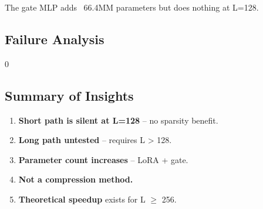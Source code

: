 The gate MLP adds ~66.4MM parameters but does nothing at L=128.

\subsection{Failure Analysis}

0

\subsection{Summary of Insights}

\begin{enumerate}
\item \textbf{Short path is silent at L=128} -- no sparsity benefit.
\item \textbf{Long path untested} -- requires L > 128.
\item \textbf{Parameter count increases} -- LoRA + gate.
\item \textbf{Not a compression method.}
\item \textbf{Theoretical speedup} exists for L $\ge$ 256.

\end{enumerate}

